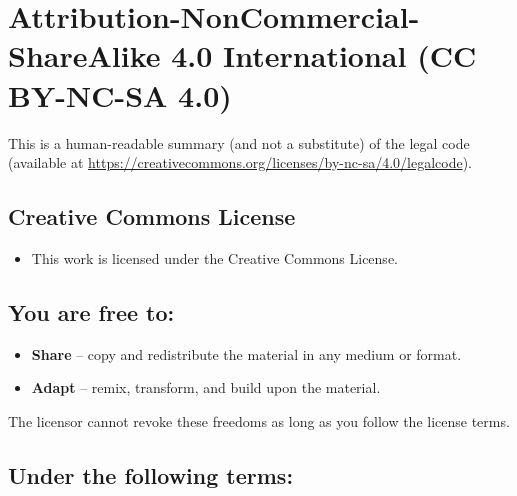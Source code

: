 \chapter*{Attribution-NonCommercial-ShareAlike 4.0 International (CC BY-NC-SA 4.0)}

This is a human-readable summary (and not a substitute) of the legal code (available at \url{https://creativecommons.org/licenses/by-nc-sa/4.0/legalcode}).

\section*{Creative Commons License}

\begin{itemize}

\item \ccLogo \quad
This work is licensed under the Creative Commons  License.

\end{itemize}

\section*{You are free to:}

\begin{itemize}

\item \textbf{Share} --
copy and redistribute the material in any medium or format.

\item \textbf{Adapt} --
remix, transform, and build upon the material.

\end{itemize}

The licensor cannot revoke these freedoms as long as you follow the license terms.

\section*{Under the following terms:}

